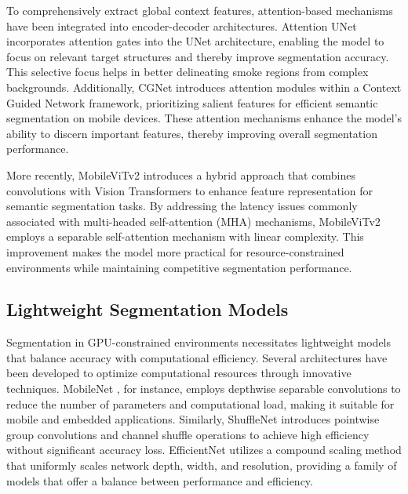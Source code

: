 To comprehensively extract global context features, attention-based mechanisms have been integrated into encoder-decoder architectures. Attention UNet \cite{oktay2018attention} incorporates attention gates into the UNet architecture, enabling the model to focus on relevant target structures and thereby improve segmentation accuracy. This selective focus helps in better delineating smoke regions from complex backgrounds. Additionally, CGNet \cite{wu2020cgnet} introduces attention modules within a Context Guided Network framework, prioritizing salient features for efficient semantic segmentation on mobile devices. These attention mechanisms enhance the model's ability to discern important features, thereby improving overall segmentation performance.

More recently, MobileViTv2 \cite{mehta2022separable} introduces a hybrid approach that combines convolutions with Vision Transformers to enhance feature representation for semantic segmentation tasks. By addressing the latency issues commonly associated with multi-headed self-attention (MHA) mechanisms, MobileViTv2 employs a separable self-attention mechanism with linear complexity. This improvement makes the model more practical for resource-constrained environments while maintaining competitive segmentation performance.



\subsection{Lightweight Segmentation Models}

Segmentation in GPU-constrained environments necessitates lightweight models that balance accuracy with computational efficiency. Several architectures have been developed to optimize computational resources through innovative techniques. MobileNet \cite{howard2017mobilenets}, for instance, employs depthwise separable convolutions to reduce the number of parameters and computational load, making it suitable for mobile and embedded applications. Similarly, ShuffleNet \cite{zhang2018shufflenet} introduces pointwise group convolutions and channel shuffle operations to achieve high efficiency without significant accuracy loss. EfficientNet \cite{tan2019efficientnet} utilizes a compound scaling method that uniformly scales network depth, width, and resolution, providing a family of models that offer a balance between performance and efficiency.

